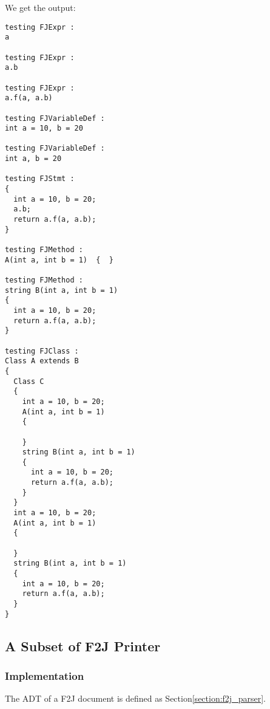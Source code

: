 We get the output:
\begin{lstlisting}
testing FJExpr :
a

testing FJExpr :
a.b

testing FJExpr :
a.f(a, a.b)

testing FJVariableDef :
int a = 10, b = 20

testing FJVariableDef :
int a, b = 20

testing FJStmt :
{
  int a = 10, b = 20;
  a.b;
  return a.f(a, a.b);
}

testing FJMethod :
A(int a, int b = 1)  {  }

testing FJMethod :
string B(int a, int b = 1)
{
  int a = 10, b = 20;
  return a.f(a, a.b);
}

testing FJClass :
Class A extends B
{
  Class C
  {
    int a = 10, b = 20;
    A(int a, int b = 1)
    {

    }
    string B(int a, int b = 1)
    {
      int a = 10, b = 20;
      return a.f(a, a.b);
    }
  }
  int a = 10, b = 20;
  A(int a, int b = 1)
  {

  }
  string B(int a, int b = 1)
  {
    int a = 10, b = 20;
    return a.f(a, a.b);
  }
}
\end{lstlisting}

\subsection{A Subset of F2J Printer}


\subsubsection{Implementation}
The ADT of a F2J document is defined as Section\ref{section:f2j_parser}.

